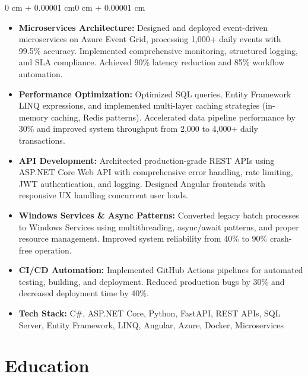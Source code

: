 \documentclass[10pt, letterpaper]{article}
\newenvironment{highlights}{
    \begin{itemize}[
        topsep=0.08 cm,
        parsep=0.08 cm,
        partopsep=0pt,
        itemsep=0pt,
        leftmargin=0 cm + 10pt
    ]
}{
    \end{itemize}
}
\newenvironment{onecolentry}{
    \begin{adjustwidth}{0 cm + 0.00001 cm}{0 cm + 0.00001 cm}
}{
    \end{adjustwidth}
}
\begin{document}
\vspace{0.007 cm}
\begin{onecolentry}
    \begin{highlights}
        \item \textbf{Microservices Architecture:} Designed and deployed event-driven microservices on Azure Event Grid, processing 1,000+ daily events with 99.5\% accuracy. Implemented comprehensive monitoring, structured logging, and SLA compliance. Achieved 90\% latency reduction and 85\% workflow automation.
        
        \item \textbf{Performance Optimization:} Optimized SQL queries, Entity Framework LINQ expressions, and implemented multi-layer caching strategies (in-memory caching, Redis patterns). Accelerated data pipeline performance by 30\% and improved system throughput from 2,000 to 4,000+ daily transactions.
        
        \item \textbf{API Development:} Architected production-grade REST APIs using ASP.NET Core Web API with comprehensive error handling, rate limiting, JWT authentication, and logging. Designed Angular frontends with responsive UX handling concurrent user loads.
        
        \item \textbf{Windows Services \& Async Patterns:} Converted legacy batch processes to Windows Services using multithreading, async/await patterns, and proper resource management. Improved system reliability from 40\% to 90\% crash-free operation.
        
        \item \textbf{CI/CD Automation:} Implemented GitHub Actions pipelines for automated testing, building, and deployment. Reduced production bugs by 30\% and decreased deployment time by 40\%.
        
        \item \textbf{Tech Stack:} C\#, ASP.NET Core, Python, FastAPI, REST APIs, SQL Server, Entity Framework, LINQ, Angular, Azure, Docker, Microservices
    \end{highlights}
\end{onecolentry}

\vspace{0.01 cm}

\section{Education}
\end{document}
